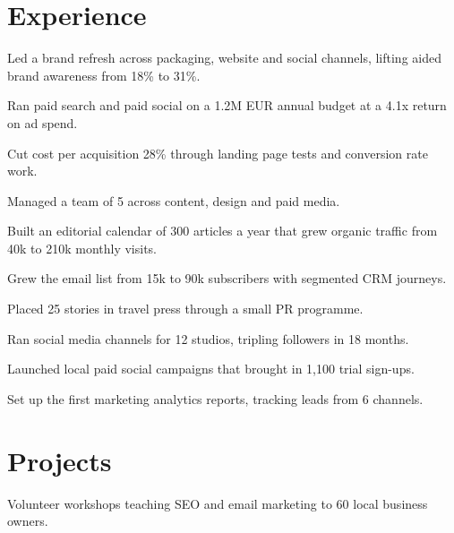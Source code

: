\documentclass[]{deedy-resume-openfont}
\begin{document}
\begin{minipage}[t]{0.66\textwidth}

\section{Experience}
\vspace{\topsep} %
\begin{tightemize}
\item Led a brand refresh across packaging, website and social channels, lifting aided brand awareness from 18\% to 31\%. %
\item Ran paid search and paid social on a 1.2M EUR annual budget at a 4.1x return on ad spend. %
\item Cut cost per acquisition 28\% through landing page tests and conversion rate work. %
\item Managed a team of 5 across content, design and paid media. %
\end{tightemize}
\sectionsep
{}
\vspace{\topsep} %
\begin{tightemize}
\item Built an editorial calendar of 300 articles a year that grew organic traffic from 40k to 210k monthly visits. %
\item Grew the email list from 15k to 90k subscribers with segmented CRM journeys. %
\item Placed 25 stories in travel press through a small PR programme. %
\end{tightemize}
\sectionsep
{}
\vspace{\topsep} %
\begin{tightemize}
\item Ran social media channels for 12 studios, tripling followers in 18 months. %
\item Launched local paid social campaigns that brought in 1,100 trial sign-ups. %
\item Set up the first marketing analytics reports, tracking leads from 6 channels. %
\end{tightemize}
\sectionsep

\section{Projects}
\begin{tightemize}
\item Volunteer workshops teaching SEO and email marketing to 60 local business owners. %
\end{tightemize}
\sectionsep

\end{minipage}
\end{document}

